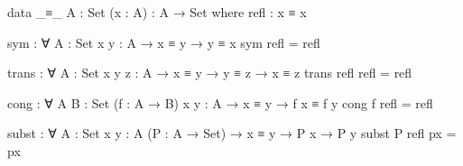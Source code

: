 \documentclass{article}
\begin{document}
\begin{prev}
\begin{code}
data _≡_ {A : Set} (x : A) : A → Set where
  refl : x ≡ x

sym : ∀ {A : Set} {x y : A} → x ≡ y → y ≡ x
sym refl = refl

trans : ∀ {A : Set} {x y z : A} → x ≡ y → y ≡ z → x ≡ z
trans refl refl = refl

cong : ∀ {A B : Set} (f : A → B) {x y : A} → x ≡ y → f x ≡ f y
cong f refl = refl

subst : ∀ {A : Set} {x y : A} (P : A → Set) → x ≡ y → P x → P y
subst P refl px = px
\end{code}
\end{prev}
\end{document}
